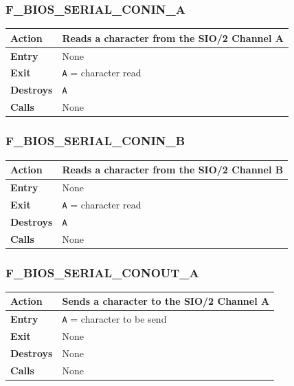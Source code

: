 \documentclass[a4paper,11pt]{article}
\begin{document}
        \subsubsection{F\_BIOS\_SERIAL\_CONIN\_A}
        \label{func:fbiosserialconina}
        \begin{tabular}{l p{9cm}}
            \hline\textbf{Action}
            & Reads a character from the \textbf{SIO/2} Channel A \\
            \hline\textbf{Entry} & None \\
            \hline\textbf{Exit} & \texttt{A} = character read \\
            \hline\textbf{Destroys} & \texttt{A} \\
            \hline\textbf{Calls} & None \\
            \hline
        \end{tabular}

        \subsubsection{F\_BIOS\_SERIAL\_CONIN\_B}
        \label{func:fbiosserialconinb}
        \begin{tabular}{l p{9cm}}
            \hline\textbf{Action}
            & Reads a character from the \textbf{SIO/2} Channel B \\
            \hline\textbf{Entry} & None \\
            \hline\textbf{Exit} & \texttt{A} = character read \\
            \hline\textbf{Destroys} & \texttt{A} \\
            \hline\textbf{Calls} & None \\
            \hline
        \end{tabular}

        \subsubsection{F\_BIOS\_SERIAL\_CONOUT\_A}
        \label{func:fbiosserialconouta}
        \begin{tabular}{l p{9cm}}
            \hline\textbf{Action}
            & Sends a character to the \textbf{SIO/2} Channel A \\
            \hline\textbf{Entry} & \texttt{A} = character to be send \\
            \hline\textbf{Exit} & None \\
            \hline\textbf{Destroys} & None \\
            \hline\textbf{Calls} & None \\
            \hline
        \end{tabular}
\end{document}
